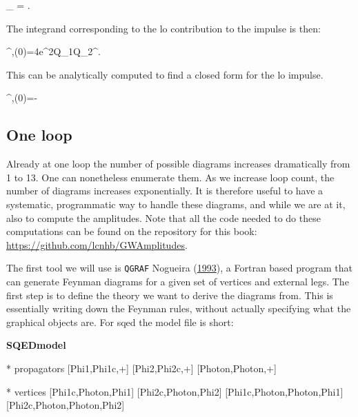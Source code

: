 \documentclass[
  11pt,
  a4paper,
  DIV=11,
  numbers=noendperiod,
  oneside]{scrreprt}
\newenvironment{Shaded}{\begin{snugshade}}{\end{snugshade}}
\newcommand{\NormalTok}[1]{\textcolor[rgb]{0.00,0.23,0.31}{#1}}
\let\[\relax \let\]\relax %
\DeclareRobustCommand{\[}{\begin{equation}}
\DeclareRobustCommand{\]}{\end{equation}}
\begin{document}
\[
\lim\limits_{\hbar {}} \dPsb{\tw}=\dn[4]{\tw} {\ndeltafn{2\mass[1]\cls{\vel[1]}\cdot\tw}}{\ndeltafn{2\mass[2]\cls{\vel[2]}\cdot \tw }}.
\]

The integrand corresponding to the \gls{lo} contribution to the impulse
is then:

\[
\Delta \emom[1]^{\mu,(0)}=4e^2Q_1Q_2\mass[1]\mass[2]\relfact\int\dn[4]{\tw}\tw^\mu {}.
\]

This can be analytically computed to find a closed form for the \gls{lo}
impulse.

\[
\Delta \emom[1]^{\mu,(0)}=-  
\]

\hypertarget{one-loop}{%
\subsection{One loop}\label{one-loop}}

Already at one loop the number of possible diagrams increases
dramatically from 1 to 13. One can nonetheless enumerate them. As we
increase loop count, the number of diagrams increases exponentially. It
is therefore useful to have a systematic, programmatic way to handle
these diagrams, and while we are at it, also to compute the amplitudes.
Note that all the code needed to do these computations can be found on
the repository for this book:
\url{https://github.com/lcnhb/GWAmplitudes}.

The first tool we will use is \texttt{QGRAF} Nogueira
(\protect\hyperlink{ref-Nogueira:1993a}{1993}), a Fortran based program
that can generate Feynman diagrams for a given set of vertices and
external legs. The first step is to define the theory we want to derive
the diagrams from. This is essentially writing down the Feynman rules,
without actually specifying what the graphical objects are. For
\gls{sqed} the model file is short:

\textbf{SQEDmodel}

\begin{Shaded}
\begin{Highlighting}[]
\NormalTok{* propagators}
\NormalTok{ [Phi1,Phi1c,+]}
\NormalTok{ [Phi2,Phi2c,+]}
\NormalTok{ [Photon,Photon,+]}

\NormalTok{* vertices}
\NormalTok{ [Phi1c,Photon,Phi1]}
\NormalTok{ [Phi2c,Photon,Phi2]}
\NormalTok{ [Phi1c,Photon,Photon,Phi1]}
\NormalTok{ [Phi2c,Photon,Photon,Phi2]}
\end{Highlighting}
\end{Shaded}
\end{document}
